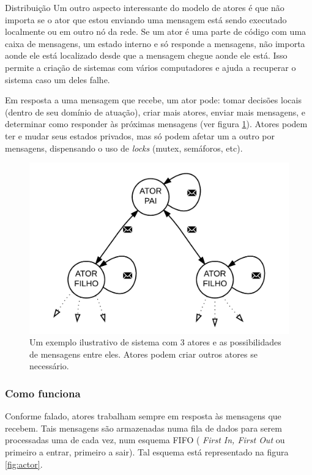 Distribuição
Um outro aspecto interessante do modelo de atores é que não importa se o ator que estou enviando uma mensagem está sendo executado localmente ou em outro nó da rede. Se um ator é uma parte de código com uma caixa de mensagens, um estado interno e só responde a mensagens, não importa aonde ele está localizado desde que a mensagem chegue aonde ele está. Isso permite a criação de sistemas com vários computadores e ajuda a recuperar o sistema caso um deles falhe.



Em resposta a uma mensagem que recebe, um ator pode: tomar decisões locais (dentro de seu domínio de atuação), criar mais atores, enviar mais mensagens, e determinar como responder às próximas mensagens (ver figura \ref{fig:actormodel}). Atores podem ter e mudar seus estados privados, mas só podem afetar um a outro por mensagens, dispensando o uso de \textit{locks} (mutex, semáforos, etc). 
            
             \begin{figure}
                \centering
                \includegraphics[width=0.9\linewidth]{fig/actormodel}
                \caption{Um exemplo ilustrativo de sistema com 3 atores e  as possibilidades de mensagens entre eles. Atores podem criar outros atores se necessário.}
                \label{fig:actormodel}
            \end{figure}
            
            
            \subsubsection{Como funciona}
                Conforme falado, atores trabalham sempre em resposta às mensagens que recebem. Tais mensagens são armazenadas numa fila de dados para serem processadas uma de cada vez, num esquema FIFO ( \textit{First In, First Out} ou primeiro a entrar, primeiro a sair). Tal esquema está representado na figura \ref{fig:actor}.
            
